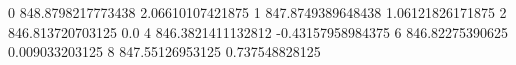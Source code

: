 0 848.8798217773438 2.06610107421875
1 847.8749389648438 1.06121826171875
2 846.813720703125 0.0
4 846.3821411132812 -0.43157958984375
6 846.82275390625 0.009033203125
8 847.55126953125 0.737548828125
